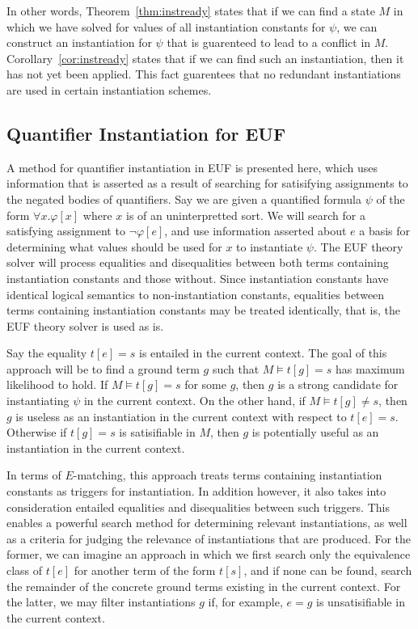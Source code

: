 \documentclass{llncs}
\begin{document}
In other words, Theorem~\ref{thm:instready} states that if we can find a state $M$ in which we have solved for values of all instantiation constants for $\psi$, we can construct an instantiation for $\psi$ that is guarenteed to lead to a conflict in $M$.
Corollary~\ref{cor:instready} states that if we can find such an instantiation, then it has not yet been applied.
This fact guarentees that no redundant instantiations are used in certain instantiation schemes.

\subsection{Quantifier Instantiation for EUF}

A method for quantifier instantiation in EUF is presented here, which uses information that is asserted as a result of searching for satisifying assignments to the negated bodies of quantifiers.
Say we are given a quantified formula $\psi$ of the form $\forall x. \varphi[x]$ where $x$ is of an uninterpretted sort.
We will search for a satisfying assignment to $\neg \varphi[e]$, and use information asserted about $e$ a basis for determining what values should be used for $x$ to instantiate $\psi$.
The EUF theory solver will process equalities and disequalities between both terms containing instantiation constants and those without.
Since instantiation constants have identical logical semantics to non-instantiation constants, equalities between terms containing instantiation constants may be treated identically, that is, the EUF theory solver is used as is.

Say the equality $t[e] = s$ is entailed in the current context.
The goal of this approach will be to find a ground term $g$ such that $M \models t[g] = s$ has maximum likelihood to hold.
If $M \models t[g] = s$ for some $g$, then $g$ is a strong candidate for instantiating $\psi$ in the current context.
On the other hand, if $M \models t[g] \neq s$, then $g$ is useless as an instantiation in the current context with respect to $t[e] = s$.
Otherwise if $t[g] = s$ is satisifiable in $M$, then $g$ is potentially useful as an instantiation in the current context.

In terms of $E$-matching, this approach treats terms containing instantiation constants as triggers for instantiation.
In addition however, it also takes into consideration entailed equalities and disequalities between such triggers.
This enables a powerful search method for determining relevant instantiations, as well as a criteria for judging the relevance of instantiations that are produced.
For the former, we can imagine an approach in which we first search only the equivalence class of $t[e]$ for another term of the form $t[s]$, and if none can be found, search the remainder of the concrete ground terms existing in the current context.
For the latter, we may filter instantiations $g$ if, for example, $e = g$ is unsatisifiable in the current context.
\end{document}
